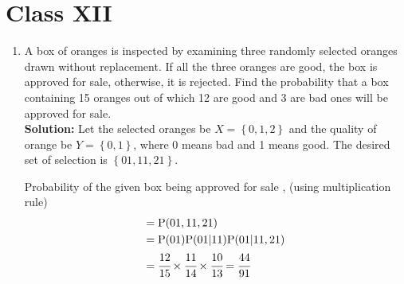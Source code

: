 \documentclass{article}
\providecommand{\cbrak}[1]{\ensuremath{\left\{#1\right\}}}
\newcommand{\solution}{\noindent \textbf{Solution: }}
\begin{document}
\section*{Class XII}

\begin{enumerate}[label=13.\arabic{enumi}.\arabic{enumii}]

\setcounter{enumi}{1}
\setcounter{enumii}{3}
\item A box of oranges is inspected by examining three randomly selected oranges drawn without replacement. If all the three oranges are good, the box is approved for sale, otherwise, it is rejected. Find the probability that a box containing 15 oranges out of which 12 are good and 3 are bad ones will be approved for sale.\\[1ex]
	\solution
		Let the selected oranges be $X = \cbrak{0,1,2}$ and the quality of orange be $Y = \cbrak{0,1}$, where 0 means bad and 1 means good. The desired set of selection is \cbrak{01,11,21}.

	\begin{table}[h!]
	\small
	\centering
	
	\end{table}

		Probability of the given box being approved for sale , (using multiplication rule)	%
	\begin{align}
		=& \; \text{P}(01 , 11 , 21) \\
		=& \; \text{P}(01)\text{P}(01|11)\text{P}(01|11 , 21) \\
		=& \; \cfrac{12}{15}\times \cfrac{11}{14}\times \cfrac{10}{13}= \cfrac{44}{91}
	\end{align}


\end{enumerate}
\end{document}

